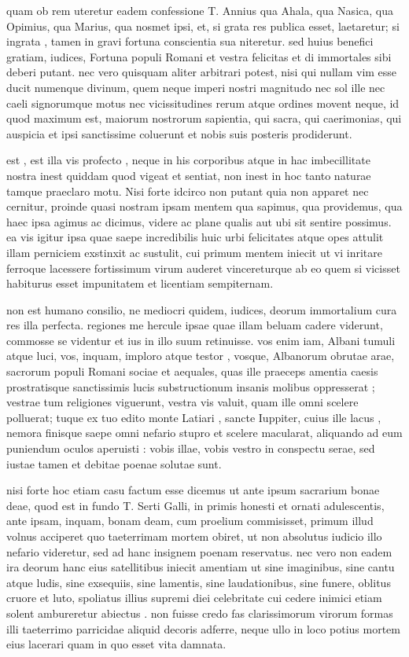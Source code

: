  quam ob rem uteretur eadem confessione T. Annius qua Ahala, qua Nasica, qua Opimius, qua Marius, qua nosmet ipsi, et, si grata res publica esset, laetaretur; si ingrata , tamen in gravi fortuna conscientia sua niteretur. sed huius benefici gratiam, iudices, Fortuna populi Romani et vestra felicitas et di immortales sibi deberi putant. nec vero quisquam aliter arbitrari potest, nisi qui nullam vim esse ducit numenque divinum, quem neque imperi nostri magnitudo nec sol ille nec caeli signorumque motus nec vicissitudines rerum atque ordines movent neque, id quod maximum est, maiorum nostrorum sapientia, qui sacra, qui caerimonias, qui auspicia et ipsi sanctissime coluerunt et nobis suis posteris prodiderunt.

 est , est illa vis profecto , neque in his corporibus atque in hac imbecillitate nostra inest quiddam quod vigeat et sentiat, non inest in hoc tanto naturae tamque praeclaro motu. Nisi forte idcirco non putant quia non apparet nec cernitur, proinde quasi nostram ipsam mentem qua sapimus, qua providemus, qua haec ipsa agimus ac dicimus, videre ac plane qualis aut ubi sit sentire possimus. ea vis igitur ipsa quae saepe incredibilis huic urbi felicitates atque opes attulit illam perniciem exstinxit ac sustulit, cui primum mentem iniecit ut vi inritare ferroque lacessere fortissimum virum auderet vincereturque ab eo quem si vicisset habiturus esset impunitatem et licentiam sempiternam.

 non est humano consilio, ne mediocri quidem, iudices, deorum immortalium cura res illa perfecta. regiones me hercule ipsae quae illam beluam cadere viderunt, commosse se videntur et ius in illo suum retinuisse. vos enim iam, Albani tumuli atque luci, vos, inquam, imploro atque testor , vosque, Albanorum obrutae arae, sacrorum populi Romani sociae et aequales, quas ille praeceps amentia caesis prostratisque sanctissimis lucis substructionum insanis molibus oppresserat ; vestrae tum religiones viguerunt, vestra vis valuit, quam ille omni scelere polluerat; tuque ex tuo edito monte Latiari , sancte Iuppiter, cuius ille lacus , nemora finisque saepe omni nefario stupro et scelere macularat, aliquando ad eum puniendum oculos aperuisti : vobis illae, vobis vestro in conspectu serae, sed iustae tamen et debitae poenae solutae sunt.

 nisi forte hoc etiam casu factum esse dicemus ut ante ipsum sacrarium bonae deae, quod est in fundo T. Serti Galli, in primis honesti et ornati adulescentis, ante ipsam, inquam, bonam deam, cum proelium commisisset, primum illud volnus acciperet quo taeterrimam mortem obiret, ut non absolutus iudicio illo nefario videretur, sed ad hanc insignem poenam reservatus. nec vero non eadem ira deorum hanc eius satellitibus iniecit amentiam ut sine imaginibus, sine cantu atque ludis, sine exsequiis, sine lamentis, sine laudationibus, sine funere, oblitus cruore et luto, spoliatus illius supremi diei celebritate cui cedere inimici etiam solent ambureretur abiectus . non fuisse credo fas clarissimorum virorum formas illi taeterrimo parricidae aliquid decoris adferre, neque ullo in loco potius mortem eius lacerari quam in quo esset vita damnata.

